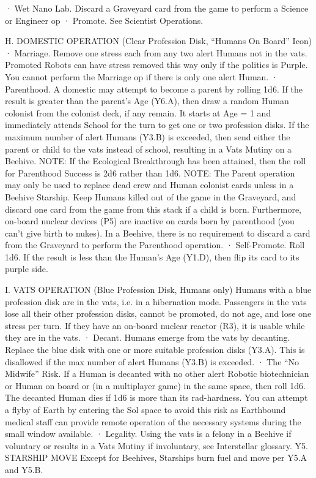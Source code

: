 \documentclass[a4paper]{book}
\begin{document}
·       Wet Nano Lab. Discard a Graveyard card from the game to perform a Science or Engineer op
·       Promote. See Scientist Operations.
 
H. DOMESTIC OPERATION (Clear Profession Disk, “Humans On Board” Icon)
·       Marriage. Remove one stress each from any two alert Humans not in the vats. Promoted Robots can have stress removed this way only if the politics is Purple. You cannot perform the Marriage op if there is only one alert Human.
·       Parenthood. A domestic may attempt to become a parent by rolling 1d6. If the result is greater than the parent’s Age (Y6.A), then draw a random Human colonist from the colonist deck, if any remain. It starts at Age = 1 and immediately attends School for the turn to get one or two profession disks. If the maximum number of alert Humans (Y3.B) is exceeded, then send either the parent or child to the vats instead of school, resulting in a Vats Mutiny on a Beehive.
NOTE: If the Ecological Breakthrough has been attained, then the roll for Parenthood Success is 2d6 rather than 1d6.  
NOTE: The Parent operation may only be used to replace dead crew and Human colonist cards unless in a Beehive Starship. Keep Humans killed out of the game in the Graveyard, and discard one card from the game from this stack if a child is born. Furthermore, on-board nuclear devices (P5) are inactive on cards born by parenthood (you can’t give birth to nukes). In a Beehive, there is no requirement to discard a card from the Graveyard to perform the Parenthood operation.
·       Self-Promote. Roll 1d6. If the result is less than the Human’s Age (Y1.D), then flip its card to its purple side.
 
I. VATS OPERATION (Blue Profession Disk, Humans only)
Humans with a blue profession disk are in the vats, i.e. in a hibernation mode. Passengers in the vats lose all their other profession disks, cannot be promoted, do not age, and lose one stress per turn. If they have an on-board nuclear reactor (R3), it is usable while they are in the vats.
·       Decant. Humans emerge from the vats by decanting. Replace the blue disk with one or more suitable profession disks (Y3.A). This is disallowed if the max number of alert Humans (Y3.B) is exceeded.
·       The “No Midwife” Risk. If a Human is decanted with no other alert Robotic biotechnician or Human on board or (in a multiplayer game) in the same space, then roll 1d6. The decanted Human dies if 1d6 is more than its rad-hardness. You can attempt a flyby of Earth by entering the Sol space to avoid this risk as Earthbound medical staff can provide remote operation of the necessary systems during the small window available.
·       Legality. Using the vats is a felony in a Beehive if voluntary or results in a Vats Mutiny if involuntary, see Interstellar glossary.
Y5. STARSHIP MOVE
Except for Beehives, Starships burn fuel and move per Y5.A and Y5.B.
 
\end{document}
